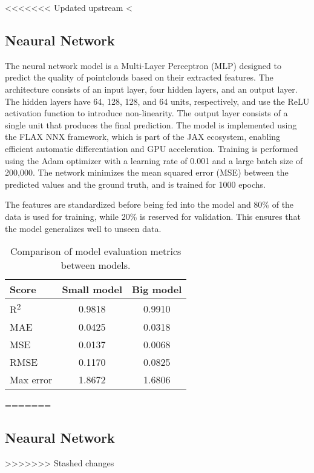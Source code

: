 <<<<<<< Updated upstream
<\subsection{Neaural Network}
The neural network model is a Multi-Layer Perceptron (MLP) designed to predict the quality of pointclouds based on their extracted features. The architecture consists of an input layer, four hidden layers, and an output layer. The hidden layers have 64, 128, 128, and 64 units, respectively, and use the ReLU activation function to introduce non-linearity. The output layer consists of a single unit that produces the final prediction. The model is implemented using the FLAX NNX framework, which is part of the JAX ecosystem, enabling efficient automatic differentiation and GPU acceleration. Training is performed using the Adam optimizer with a learning rate of 0.001 and a large batch size of 200,000. The network minimizes the mean squared error (MSE) between the predicted values and the ground truth, and is trained for 1000 epochs.

The features are standardized before being fed into the model and 80\% of the data is used for training, while 20\% is reserved for validation. This ensures that the model generalizes well to unseen data. 


\begin{table}[htbp]
\centering
\begin{tabular}{|l|c|c|}
\hline
\textbf{Score} & \textbf{Small model} & \textbf{Big model} \\
\hline
R\textsuperscript{2} & 0.9818 & 0.9910 \\
MAE & 0.0425 & 0.0318 \\
MSE & 0.0137 & 0.0068 \\
RMSE & 0.1170 & 0.0825 \\
Max error & 1.8672 & 1.6806 \\
\hline
\end{tabular}
\vspace{0.5em}  %
\caption{Comparison of model evaluation metrics between models.}
\label{tab:model_metrics}
\end{table}
=======
\subsection{Neaural Network}
>>>>>>> Stashed changes
